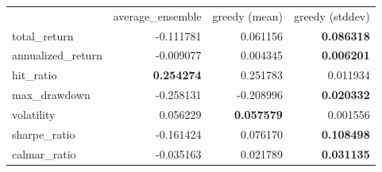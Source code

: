 \begin{tabular}{lrrr}
 & average_ensemble & greedy (mean) & greedy (stddev) \\
total_return & -0.111781 & 0.061156 & \bfseries 0.086318 \\
annualized_return & -0.009077 & 0.004345 & \bfseries 0.006201 \\
hit_ratio & \bfseries 0.254274 & 0.251783 & 0.011934 \\
max_drawdown & -0.258131 & -0.208996 & \bfseries 0.020332 \\
volatility & 0.056229 & \bfseries 0.057579 & 0.001556 \\
sharpe_ratio & -0.161424 & 0.076170 & \bfseries 0.108498 \\
calmar_ratio & -0.035163 & 0.021789 & \bfseries 0.031135 \\
\end{tabular}
